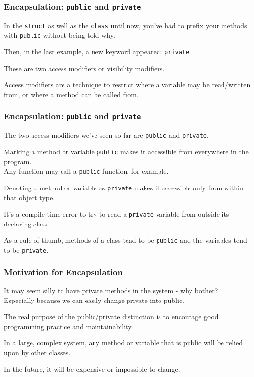 \begin{frame}
\frametitle{Encapsulation: \texttt{public} and \texttt{private}}

In the \texttt{struct} as well as the \texttt{class} until now, you've had to prefix your methods with \texttt{public} without being told why.

Then, in the last example, a new keyword appeared: \texttt{private}.

These are two \alert{access modifiers} or \alert{visibility modifiers}.

Access modifiers are a technique to restrict where a variable may be read/written from, or where a method can be called from.

\end{frame}

\begin{frame}
\frametitle{Encapsulation: \texttt{public} and \texttt{private}}

The two access modifiers we've seen so far are \texttt{public} and \texttt{private}.

Marking a method or variable \texttt{public} makes it accessible from everywhere in the program. \\
\quad Any function may call a \texttt{public} function, for example.

Denoting a method or variable as \texttt{private} makes it accessible only from within that object type.

It's a compile time error to try to read a \texttt{private} variable from outside its declaring class.

As a rule of thumb, methods of a class tend to be \texttt{public} and the variables tend to be \texttt{private}.

\end{frame}

\begin{frame}
\frametitle{Motivation for Encapsulation}
It may seem silly to have private methods in the system - why bother?\\
\quad Especially because we can easily change private into public.

The real purpose of the public/private distinction is to encourage good programming practice and maintainability.

In a large, complex system, any method or variable that is public will be relied upon by other classes.

In the future, it will be expensive or impossible to change.

\end{frame}

